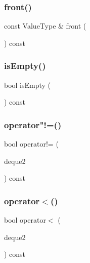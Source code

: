 \mbox{\label{classDeque_a02aaa52ad7a120201f6dd3e90eff737f}} 
\subsubsection{\texorpdfstring{front()}{front()}}
{\footnotesize\ttfamily const Value\+Type \& front (\begin{DoxyParamCaption}{ }\end{DoxyParamCaption}) const}

\mbox{\label{classDeque_acf82f9b2937375c7b1cf3dccb3df3312}} 
\subsubsection{\texorpdfstring{is\+Empty()}{isEmpty()}}
{\footnotesize\ttfamily bool is\+Empty (\begin{DoxyParamCaption}{ }\end{DoxyParamCaption}) const}

\mbox{\label{classDeque_a512bc8214fed49868d85acd8f1e351d3}} 
\subsubsection{\texorpdfstring{operator"!=()}{operator!=()}}
{\footnotesize\ttfamily bool operator!= (\begin{DoxyParamCaption}\item[{const \mbox{\hyperlink{classDeque}{Deque}}$<$ Value\+Type $>$ \&}]{deque2 }\end{DoxyParamCaption}) const}

\mbox{\label{classDeque_afdfe6d4b99c8d185f9f8c6d48fc19c88}} 
\subsubsection{\texorpdfstring{operator$<$()}{operator<()}}
{\footnotesize\ttfamily bool operator$<$ (\begin{DoxyParamCaption}\item[{const \mbox{\hyperlink{classDeque}{Deque}}$<$ Value\+Type $>$ \&}]{deque2 }\end{DoxyParamCaption}) const}

